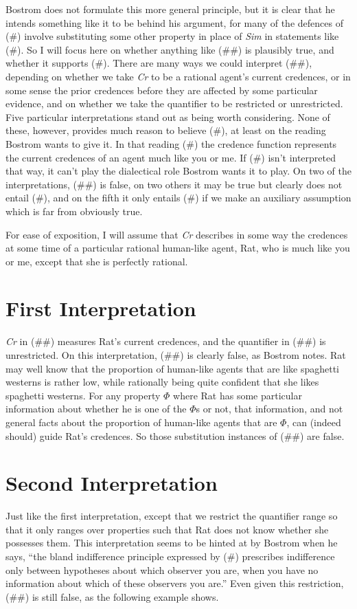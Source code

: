 \noindent Bostrom does not formulate this more general principle, but it is clear that he intends something like it to be behind his argument, for many of the defences of (\#) involve substituting some other property in place of \textit{Sim} in statements like (\#). So I will focus here on whether anything like (\#\#) is plausibly true, and whether it supports (\#). There are many ways we could interpret (\#\#), depending on whether we take \textit{Cr} to be a rational agent's current credences, or in some sense the prior credences before they are affected by some particular evidence, and on whether we take the quantifier to be restricted or unrestricted. Five particular interpretations stand out as being worth considering. None of these, however, provides much reason to believe (\#), at least on the reading Bostrom wants to give it. In that reading (\#) the credence function represents the current credences of an agent much like you or me. If (\#) isn't interpreted that way, it can't play the dialectical role Bostrom wants it to play. On two of the interpretations, (\#\#) is false, on two others it may be true but clearly does not entail (\#), and on the fifth it only entails (\#) if we make an  auxiliary assumption which is far from obviously true.

For ease of exposition, I will assume that \textit{Cr} describes in some way the credences at some time of a particular rational human-like agent, Rat, who is much like you or me, except that she is perfectly rational.

\section{First Interpretation} 
\textit{Cr} in (\#\#) measures Rat's current credences, and the quantifier in (\#\#) is unrestricted. On this interpretation, (\#\#) is clearly false, as Bostrom notes. Rat may well know that the proportion of human-like agents that are like spaghetti westerns is rather low, while rationally being quite confident that she likes spaghetti westerns. For any property ${\Phi}$ where Rat has some particular information about whether he is one of the ${\Phi}$s or not, that information, and not general facts about the proportion of human-like agents that are ${\Phi}$, can (indeed should) guide Rat's credences. So those substitution instances of (\#\#) are false.

\section{Second Interpretation} 
Just like the first interpretation, except that we restrict the quantifier range so that it only ranges over properties such that Rat does not know whether she possesses them. This interpretation seems to be hinted at by Bostrom when he says, ``the bland indifference principle expressed by (\#) prescribes indifference only between hypotheses about which observer you are, when you have no information about which of these observers you are.'' Even given this restriction, (\#\#) is still false, as the following example shows.

